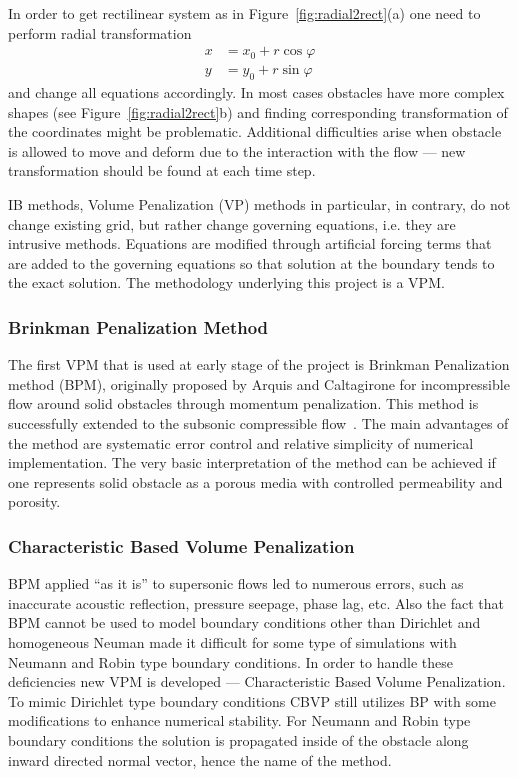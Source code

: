 In order to get rectilinear system as in Figure~\ref{fig:radial2rect}(a) one need to perform radial transformation
\begin{align*}
x &= x_0 + r\cos \varphi \\
y &= y_0 + r\sin \varphi
\end{align*}
and change all equations accordingly. In most cases obstacles have more complex shapes (see Figure~\ref{fig:radial2rect}b) and finding corresponding transformation of the coordinates might be problematic. Additional difficulties arise when obstacle is allowed to move and deform due to the interaction with the flow --- new transformation should be found at each time step.

IB methods, Volume Penalization (VP) methods in particular, in contrary, do not change existing grid, but rather change governing equations, i.e. they are intrusive methods. Equations are modified through artificial forcing terms that are added to the governing equations so that solution at the boundary tends to the exact solution. The methodology underlying this project is a VPM.
\subsubsection{Brinkman Penalization Method}
\label{sec:brinkman_penal_chapter1}
The first VPM that is used at early stage of the project is Brinkman Penalization method (BPM), originally proposed by Arquis and Caltagirone \cite{lib:vp_brink} for incompressible flow around solid obstacles through momentum penalization. This method is successfully extended to the subsonic compressible flow~\cite{lib:vp_liu}. The main advantages of the method are systematic error control and relative simplicity of numerical implementation. The very basic interpretation of the method can be achieved if one represents solid obstacle as a porous media with controlled permeability and porosity.

\subsubsection{Characteristic Based Volume Penalization}
BPM applied ``as it is'' to supersonic flows led to numerous errors, such as inaccurate acoustic reflection, pressure seepage, phase lag, etc. Also the fact that BPM cannot be used to model boundary conditions other than Dirichlet and homogeneous Neuman made it difficult for some type of simulations with Neumann and Robin type boundary conditions. In order to handle these deficiencies new VPM is developed --- Characteristic Based Volume Penalization. To mimic Dirichlet type boundary conditions CBVP still utilizes BP with some modifications to enhance numerical stability. For Neumann and Robin type boundary conditions the solution is propagated inside of the obstacle along inward directed normal vector, hence the name of the method. 

